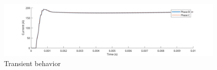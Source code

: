 \begin{figure}[htb]
\begingroup
\tikzset{}
 \centerline{\includegraphics[width=.35\columnwidth]{.//Figure/EPS/transient_current.svg}}
 \endgroup
 \caption{Transient behavior}
 \label{fig:transient}
\end{figure}